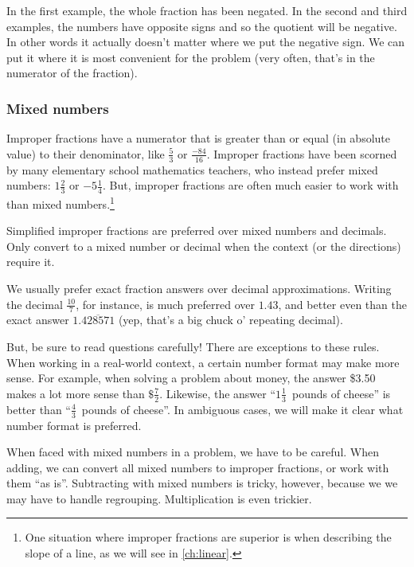 In the first example, the whole fraction has been negated. In the second and third examples, the numbers have opposite signs and so the quotient will be negative. In other words it actually doesn't matter where we put the negative sign. We can put it where it is most convenient for the problem (very often, that's in the numerator of the fraction).

\subsubsection{Mixed numbers}

Improper fractions have a numerator that is greater than or equal (in absolute value) to their denominator, like $\frac{5}{3}$ or $\frac{-84}{16}$. Improper fractions have been scorned by many elementary school mathematics teachers, who instead prefer mixed numbers: $1\frac{2}{3}$ or $-5\frac{1}{4}$. But, improper fractions are often much easier to work with than mixed numbers.\footnote{One situation where improper fractions are superior is when describing the slope of a line, as we will see in \cref{ch:linear}.}

\begin{boxcrit}
Simplified \glspl{improper fraction} are preferred over \glspl{mixed number} and decimals. Only convert to a mixed number or decimal when the context (or the directions) require it.
\end{boxcrit}

We usually prefer exact fraction answers over decimal approximations. Writing the decimal $\frac{10}{7}$, for instance, is much preferred over $1.43$, and better even than the exact answer $1.\overline{428571}$ (yep, that's a big chuck o' repeating decimal).

But, be sure to read questions carefully! There are exceptions to these rules. When working in a real-world context, a certain number format may make more sense. For example, when solving a problem about money, the answer \$3.50 makes a lot more sense than $\$\frac{7}{2}$. Likewise, the answer ``$1\frac{1}{3}$~pounds of cheese'' is better than ``$\frac{4}{3}$~pounds of cheese''. In ambiguous cases, we will make it clear what number format is preferred.

When faced with mixed numbers in a problem, we have to be careful. When adding, we can convert all mixed numbers to improper fractions, or work with them ``as is''. Subtracting with mixed numbers is tricky, however, because we we may have to handle regrouping. Multiplication is even trickier.

